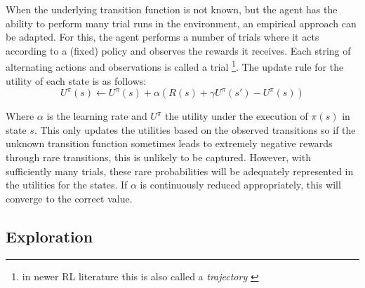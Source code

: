 When the underlying transition function is not known, but the agent has the ability to perform many trial runs in the
environment, an empirical approach can be adapted. For this, the agent performs a number of trials where it acts
according to a (fixed) policy and observes the rewards it receives. Each string of alternating actions and observations
is called a trial
\footnote{in newer \ac {RL} literature this is also called a \emph{trajectory} \citep{proximalpolicyopt, heess2017emergence} }. 
The update rule for the utility of each state is as follows:
\[
U^\pi(s) \gets U^\pi(s) + \alpha(R(s) + \gamma U^\pi(s') - U^\pi(s))
\]

Where $\alpha$ is the learning rate and $U^\pi$ the utility under the execution of $\pi(s)$ in state $s$. This only
updates the utilities based on the observed transitions so if the unknown transition function sometimes leads to
extremely negative rewards through rare transitions, this is unlikely to be captured. However, with sufficiently many
trials, these rare probabilities will be adequately represented in the utilities for the states. If $\alpha$ is
continuously reduced appropriately, this will converge to the correct value. 

\subsection{Exploration}%
\label{sub:exploration}

